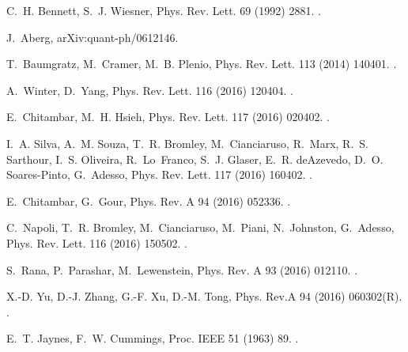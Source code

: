 \documentclass[twocolumn,3p,times]{elsarticle}
\begin{document}
\begin{thebibliography}{10}
C.~H. Bennett, S.~J. Wiesner, Phys. Rev. Lett. 69 (1992) 2881.
\newblock \href {http://dx.doi.org/10.1103/PhysRevLett.69.2881}
  {}.

J.~Aberg, arXiv:quant-ph/0612146.

T.~Baumgratz, M.~Cramer, M.~B. Plenio, Phys. Rev. Lett. 113 (2014) 140401.
\newblock \href {http://dx.doi.org/10.1103/PhysRevLett.113.140401}
  {}.

A.~Winter, D.~Yang, Phys. Rev. Lett. 116 (2016) 120404.
\newblock \href {http://dx.doi.org/10.1103/PhysRevLett.116.120404}
  {}.

E.~Chitambar, M.~H. Hsieh, Phys. Rev. Lett. 117 (2016) 020402.
\newblock \href {http://dx.doi.org/10.1103/PhysRevLett.117.020402}
  {}.

I.~A. Silva, A.~M. Souza, T.~R. Bromley, M.~Cianciaruso, R.~Marx, R.~S.
  Sarthour, I.~S. Oliveira, R.~Lo~Franco, S.~J. Glaser, E.~R. deAzevedo, D.~O.
  Soares-Pinto, G.~Adesso, Phys. Rev. Lett. 117 (2016) 160402.
\newblock \href {http://dx.doi.org/10.1103/PhysRevLett.117.160402}
  {}.

E.~Chitambar, G.~Gour, Phys. Rev. A 94 (2016) 052336.
\newblock \href {http://dx.doi.org/10.1103/PhysRevA.94.052336}
  {}.

C.~Napoli, T.~R. Bromley, M.~Cianciaruso, M.~Piani, N.~Johnston, G.~Adesso,
  Phys. Rev. Lett. 116 (2016) 150502.
\newblock \href {http://dx.doi.org/10.1103/PhysRevLett.116.150502}
  {}.

S.~Rana, P.~Parashar, M.~Lewenstein, Phys. Rev. A 93 (2016) 012110.
\newblock \href {http://dx.doi.org/10.1103/PhysRevA.93.012110}
  {}.

X.-D. Yu, D.-J. Zhang, G.-F. Xu, D.-M. Tong, Phys. Rev.A 94 (2016) 060302(R).
\newblock \href {http://dx.doi.org/10.1103/PhysRevA.94.060302}
  {}.

E.~T. Jaynes, F.~W. Cummings, Proc. IEEE 51 (1963) 89.
\newblock \href {http://dx.doi.org/10.1109/PROC.1963.1664}
  {}.


\end{thebibliography}
\end{document}
